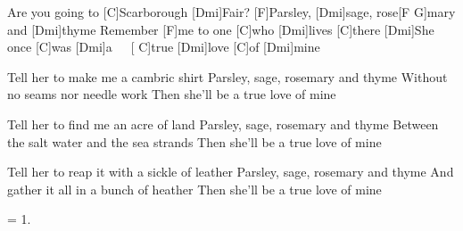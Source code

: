 
\sloka
[Dmi]Are you going to [C]Scarborough [Dmi]Fair?
[F]Parsley, [Dmi]sage, rose[F G]mary and [Dmi]thyme
Remember [F]me to one [C]who [Dmi]lives [C]there
[Dmi]She once [C]was [Dmi]a\ \ \ [ C]true [Dmi]love [C]of [Dmi]mine

\sloka
Tell her to make me a cambric shirt
Parsley, sage, rosemary and thyme
Without no seams nor needle work
Then she’ll be a true love of mine

\sloka
Tell her to find me an acre of land
Parsley, sage, rosemary and thyme
Between the salt water and the sea strands
Then she’ll be a true love of mine

\sloka
Tell her to reap it with a sickle of leather
Parsley, sage, rosemary and thyme
And gather it all in a bunch of heather
Then she’ll be a true love of mine

\sloka
= 1.
